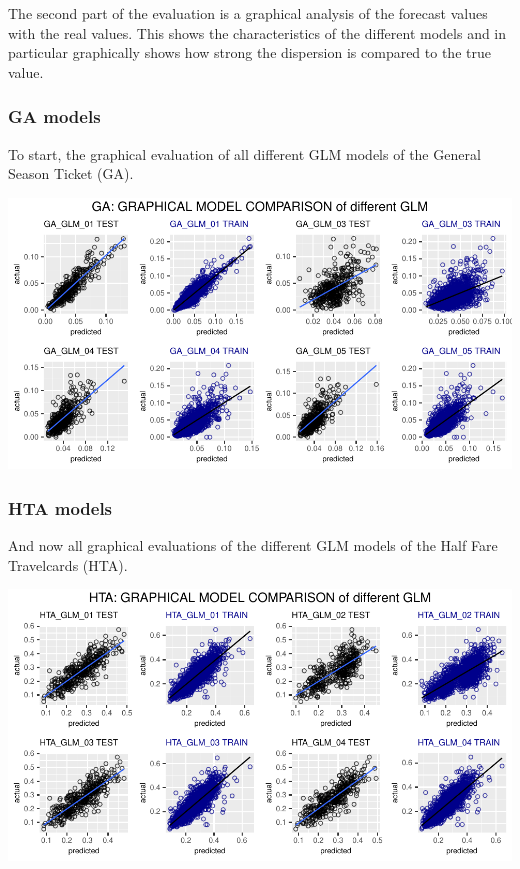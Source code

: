 \documentclass[
]{article}
\begin{document}
The second part of the evaluation is a graphical analysis of the
forecast values with the real values. This shows the characteristics of
the different models and in particular graphically shows how strong the
dispersion is compared to the true value.

\hypertarget{ga-models}{%
\subsubsection{GA models}\label{ga-models}}

To start, the graphical evaluation of all different GLM models of the
General Season Ticket (GA).

\includegraphics{Influence_factors_files/figure-latex/2.28_GA_model_eval_graphically-1.pdf}

\hypertarget{hta-models}{%
\subsubsection{HTA models}\label{hta-models}}

And now all graphical evaluations of the different GLM models of the
Half Fare Travelcards (HTA).

\includegraphics{Influence_factors_files/figure-latex/2.29_HTA_model_eval_graphically-1.pdf}
\end{document}
